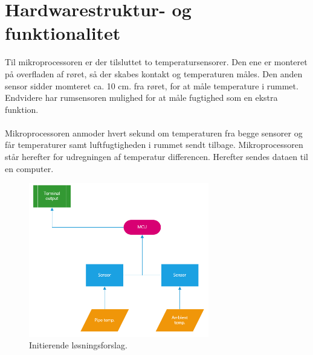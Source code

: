 \section{Hardwarestruktur- og funktionalitet}
Til mikroprocessoren er der tilsluttet to  temperatursensorer. Den ene er monteret på overfladen af røret, så der skabes kontakt og temperaturen måles. Den anden sensor sidder momteret ca. 10 cm. fra røret, for at måle temperature i rummet. Endvidere har rumsensoren mulighed for at måle fugtighed som en ekstra funktion.
\\
\\
Mikroprocessoren anmoder hvert sekund om temperaturen fra begge sensorer og får temperaturer samt luftfugtigheden i rummet sendt tilbage. 
Mikroprocessoren står herefter for udregningen af temperatur differencen. Herefter
sendes dataen til en computer.\newline

\begin{figure}[h!]
  \centering
  \includegraphics[width=0.7\textwidth]{figures/Phase1.PNG}
  \caption{Initierende løsningsforslag.}
\end{figure}








